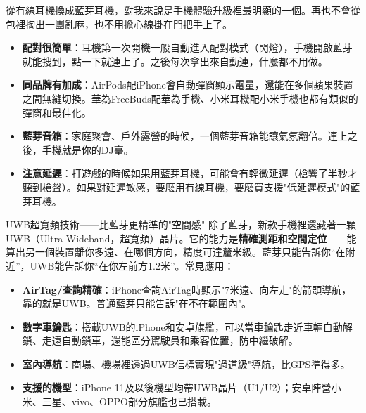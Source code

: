 
從有線耳機換成藍芽耳機，對我來說是手機體驗升級裡最明顯的一個。再也不會從包裡掏出一團亂麻，也不用擔心線掛在門把手上了。

\begin{itemize}
  \item \textbf{配對很簡單}：耳機第一次開機一般自動進入配對模式（閃燈），手機開啟藍芽就能搜到，點一下就連上了。之後每次拿出來自動連，什麼都不用做。
  \item \textbf{同品牌有加成}：AirPods配iPhone會自動彈窗顯示電量，還能在多個蘋果裝置之間無縫切換。華為FreeBuds配華為手機、小米耳機配小米手機也都有類似的彈窗和最佳化。
  \item \textbf{藍芽音箱}：家庭聚會、戶外露營的時候，一個藍芽音箱能讓氣氛翻倍。連上之後，手機就是你的DJ臺。
  \item \textbf{注意延遲}：打遊戲的時候如果用藍芽耳機，可能會有輕微延遲（槍響了半秒才聽到槍聲）。如果對延遲敏感，要麼用有線耳機，要麼買支援"低延遲模式"的藍芽耳機。
\end{itemize}

\begin{tcbinfo}{UWB超寬頻技術——比藍芽更精準的"空間感"}
除了藍芽，新款手機裡還藏著一顆UWB（Ultra-Wideband，超寬頻）晶片。它的能力是\textbf{精確測距和空間定位}——能算出另一個裝置離你多遠、在哪個方向，精度可達釐米級。藍芽只能告訴你“在附近”，UWB能告訴你“在你左前方1.2米”。常見應用：

\begin{itemize}
  \item \textbf{AirTag/查詢精確}：iPhone查詢AirTag時顯示"7米遠、向左走"的箭頭導航，靠的就是UWB。普通藍芽只能告訴"在不在範圍內"。
  \item \textbf{數字車鑰匙}：搭載UWB的iPhone和安卓旗艦，可以當車鑰匙走近車輛自動解鎖、走遠自動鎖車，還能區分駕駛員和乘客位置，防中繼破解。
  \item \textbf{室內導航}：商場、機場裡透過UWB信標實現"過道級"導航，比GPS準得多。
  \item \textbf{支援的機型}：iPhone 11及以後機型均帶UWB晶片（U1/U2）；安卓陣營小米、三星、vivo、OPPO部分旗艦也已搭載。
\end{itemize}

\end{tcbinfo}


